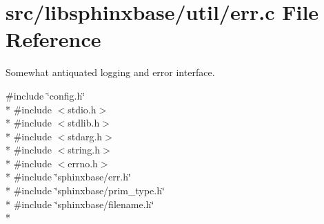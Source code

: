 \section{src/libsphinxbase/util/err.c File Reference}
\label{err_8c}


Somewhat antiquated logging and error interface.  


{\ttfamily \#include \char`\"{}config.\-h\char`\"{}}\\*
{\ttfamily \#include $<$stdio.\-h$>$}\\*
{\ttfamily \#include $<$stdlib.\-h$>$}\\*
{\ttfamily \#include $<$stdarg.\-h$>$}\\*
{\ttfamily \#include $<$string.\-h$>$}\\*
{\ttfamily \#include $<$errno.\-h$>$}\\*
{\ttfamily \#include \char`\"{}sphinxbase/err.\-h\char`\"{}}\\*
{\ttfamily \#include \char`\"{}sphinxbase/prim\-\_\-type.\-h\char`\"{}}\\*
{\ttfamily \#include \char`\"{}sphinxbase/filename.\-h\char`\"{}}\\*
